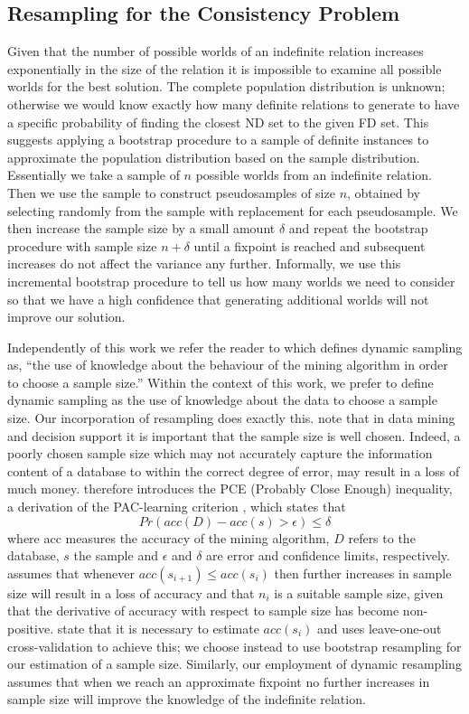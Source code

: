 \subsection{Resampling for the Consistency Problem}
Given that the number of  possible worlds of an indefinite relation increases
exponentially in the size of the relation  it is impossible to
examine all possible worlds for the best solution.  The
complete population distribution is unknown; otherwise we would know 
exactly how many definite relations to
generate to have a specific probability of finding the closest ND set
to the given FD set.  This suggests 
applying a bootstrap procedure to a sample of definite instances 
to approximate the population distribution based on the sample
distribution.  Essentially we take a sample of
$n$ possible
worlds from an indefinite relation. Then we use the sample
to construct pseudosamples of size $n$, obtained by selecting
randomly from the sample with replacement for each pseudosample. 
We then increase the sample size by a small amount $\delta$ and repeat
the bootstrap procedure with sample size $n + \delta$ until a fixpoint
is reached and subsequent increases do not affect the variance any further.
Informally, we use this incremental
bootstrap procedure to tell us how many worlds we need 
to consider so that we have a high confidence that generating additional
worlds will not improve our solution.

\medskip

Independently of this work we refer the reader to \cite{jl96} which
defines dynamic sampling as, ``the use of knowledge about the
behaviour of the mining algorithm in order to choose a sample size.''
Within the context of this work, we prefer to define dynamic sampling
as the use of knowledge about the data to choose a sample size. Our
incorporation of resampling does exactly this.
\cite{jl96} note that in data mining and decision support it is
important that the sample size is well chosen.  Indeed, a poorly
chosen sample size which may not accurately capture the information
content of a database to within the correct degree of error, may
result in a loss of much money. \cite{jl96} therefore introduces the
PCE (Probably Close Enough) inequality, a derivation of the
PAC-learning criterion \cite{val84,ab92}, which states that
\[
Pr(acc(D) - acc(s) > \epsilon) \le \delta
\]
where acc measures the accuracy of the mining algorithm, $D$ refers to
the database, $s$ the sample and $\epsilon$ and $\delta$ are error and
confidence limits, respectively. \cite{jl96} assumes that whenever
$acc(s_{i+1}) \le acc(s_i)$ 
then further increases in sample size will result in a loss of
accuracy and that $n_i$ is a suitable sample size, given that the
derivative of accuracy with respect to sample size has become
non-positive. \cite{jl96} state 
that it is necessary to estimate $acc(s_i)$ and uses leave-one-out
cross-validation to achieve this; we choose instead to use bootstrap resampling for
our estimation of a sample size. 
Similarly, our
employment of dynamic resampling assumes that when we reach an
approximate fixpoint no further increases in sample size will improve
the knowledge of the indefinite relation. 

